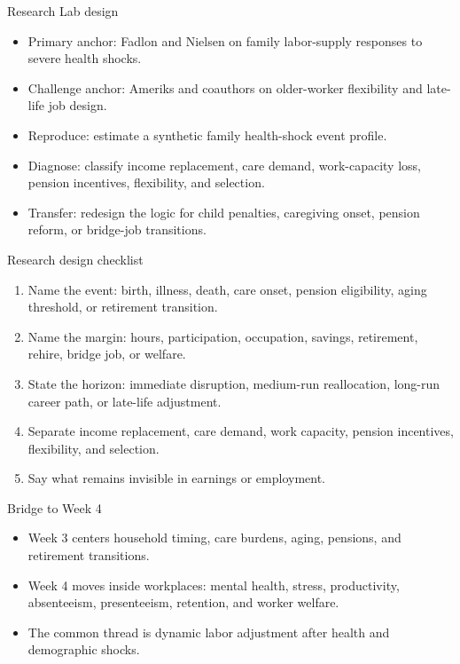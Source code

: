 \documentclass[aspectratio=169,11pt]{beamer}
\begin{document}
\begin{frame}{Research Lab design}
\begin{itemize}
    \item Primary anchor: Fadlon and Nielsen on family labor-supply responses to severe health shocks.
    \item Challenge anchor: Ameriks and coauthors on older-worker flexibility and late-life job design.
    \item Reproduce: estimate a synthetic family health-shock event profile.
    \item Diagnose: classify income replacement, care demand, work-capacity loss, pension incentives, flexibility, and selection.
    \item Transfer: redesign the logic for child penalties, caregiving onset, pension reform, or bridge-job transitions.
\end{itemize}
\end{frame}

\begin{frame}{Research design checklist}
\begin{enumerate}
    \item Name the event: birth, illness, death, care onset, pension eligibility, aging threshold, or retirement transition.
    \item Name the margin: hours, participation, occupation, savings, retirement, rehire, bridge job, or welfare.
    \item State the horizon: immediate disruption, medium-run reallocation, long-run career path, or late-life adjustment.
    \item Separate income replacement, care demand, work capacity, pension incentives, flexibility, and selection.
    \item Say what remains invisible in earnings or employment.
\end{enumerate}
\end{frame}

\begin{frame}{Bridge to Week 4}
\begin{itemize}
    \item Week 3 centers household timing, care burdens, aging, pensions, and retirement transitions.
    \item Week 4 moves inside workplaces: mental health, stress, productivity, absenteeism, presenteeism, retention, and worker welfare.
    \item The common thread is dynamic labor adjustment after health and demographic shocks.
\end{itemize}
\end{frame}
\end{document}
